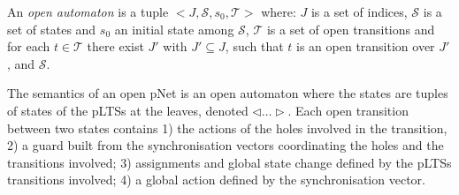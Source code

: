 \documentclass{llncs}
\begin{document}
\begin{definition}
	\label{defn:open-automaton}
	An \emph{open automaton} is a tuple $<\!\!J,\mathcal{S},s_0,\mathcal{T}\!\!>$ where:
 $J$ is a  set of indices,
  $\mathcal{S}$ is a set of states and $s_0$ an initial state
		among $\mathcal{S}$,
$\mathcal{T}$ is a set of open transitions and for each
		$t\in \mathcal{T}$ there exist  $J'$ with  $J'
		\subseteq J$, such that $t$ is an open transition over  $J'$,
		and  $\mathcal{S}$.
%		
\end{definition}
	

%


The semantics of an open pNet is an open automaton where  the states are
tuples of states of the pLTSs at the leaves, denoted $\triangleleft\ldots\triangleright$.  Each open transition between two states contains 1) the actions of the holes involved in the transition, 2) a guard  built from the synchronisation vectors coordinating the holes and the transitions involved; 3) assignments and global state change  defined by the pLTSs transitions involved; 4) a global action  defined by the synchronisation vector. 
\end{document}
